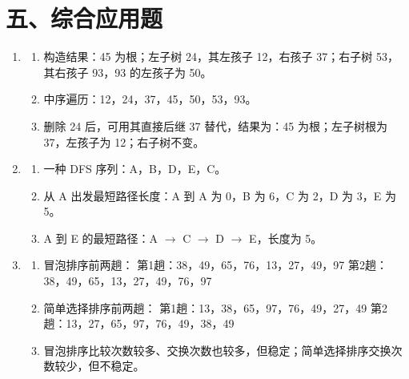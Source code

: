 \documentclass{../../note}
\begin{document}
\section*{五、综合应用题}

\begin{enumerate}[itemsep=1em]
\item
\begin{enumerate}[label=(\arabic*)]
\item 构造结果：45 为根；左子树 24，其左孩子 12，右孩子 37；右子树 53，其右孩子 93，93 的左孩子为 50。
\item 中序遍历：12，24，37，45，50，53，93。
\item 删除 24 后，可用其直接后继 37 替代，结果为：45 为根；左子树根为 37，左孩子为 12；右子树不变。
\end{enumerate}

\item
\begin{enumerate}[label=(\arabic*)]
\item 一种 DFS 序列：A，B，D，E，C。
\item 从 A 出发最短路径长度：A 到 A 为 0，B 为 6，C 为 2，D 为 3，E 为 5。
\item A 到 E 的最短路径：A $\rightarrow$ C $\rightarrow$ D $\rightarrow$ E，长度为 5。
\end{enumerate}

\item
\begin{enumerate}[label=(\arabic*)]
\item 冒泡排序前两趟：\newline
第1趟：38，49，65，76，13，27，49，97\newline
第2趟：38，49，65，13，27，49，76，97
\item 简单选择排序前两趟：\newline
第1趟：13，38，65，97，76，49，27，49\newline
第2趟：13，27，65，97，76，49，38，49
\item 冒泡排序比较次数较多、交换次数也较多，但稳定；简单选择排序交换次数较少，但不稳定。
\end{enumerate}
\end{enumerate}
\end{document}
